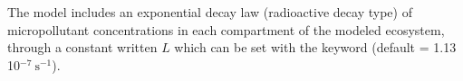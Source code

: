 The model includes an exponential decay law (radioactive decay type) of micropollutant
concentrations in each compartment of the modeled ecosystem,
through a constant written $L$
which can be set with the keyword
 (default = 1.13 10$^{-7}~\textrm{s}^{-1}$).
